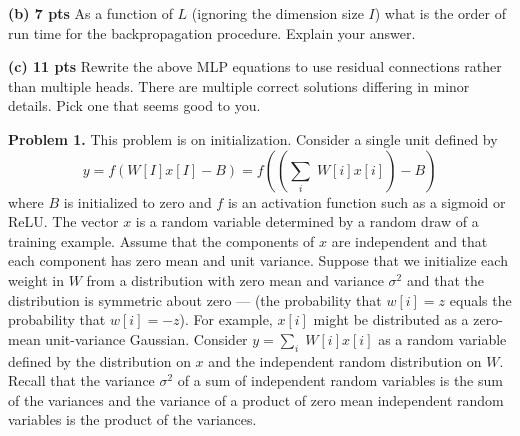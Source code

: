 \documentclass{article}
\newcommand{\solution}[1]{}
\begin{document}
\medskip
{\bf (b) 7 pts} As a function of $L$ (ignoring the dimension size $I$) what is the order of run time for the backpropagation procedure.
Explain your answer.

\solution{It is $O(L)$ --- linear in $L$.  Backpropagation loops over the assignments of the program and takes time proportional to the size of the program.
  Back-propagation over the final sum of losses produces a gradient for each prediction $\hat{y}_\ell$ which can be used as we back-propagate over the
  earlier assignments.
}

\medskip
{\bf (c) 11 pts} Rewrite the above MLP equations to use residual connections rather than multiple heads.  There are multiple correct solutions differing in minor details.  Pick one that seems
good to you.

\solution{
\begin{eqnarray*}
  h_0[i] & = & x[i] \\
  & \vdots & \\
  \tilde{h}_{\ell+1}[i] & = & \sigma(W^{h,h}_{\ell+1}[i,I]h_\ell[I] - B^{h,h}_{\ell+1}[i]) \\
  h_{\ell+1}[i] & = & \tilde{h}_{\ell+1}[i] + h_\ell[i] \\
  & \vdots & \\
  \hat{y} & = & W^{h,y}[I]h_L[I]- B^{h,y} \\
  \mathrm{Loss} & = & (y - \hat{y})^2
\end{eqnarray*}
}
\medsip
{\bf Problem 1.}  This problem is on initialization.  Consider a single unit defined by
$$y = f(W[I]x[I] - B) = f\left(\left(\sum_i\;W[i]x[i]\right) - B\right)$$
where $B$ is initialized to zero and $f$ is an activation function such as a sigmoid or ReLU.
The vector $x$ is a random variable determined by a random draw of a training example.
Assume that the components of $x$ are independent and that each component has zero mean and unit variance.
Suppose that we initialize each weight in $W$ from a distribution with
zero mean and variance $\sigma^2$ and that the distribution is symmetric about zero --- (the probability that $w[i] = z$ equals the probability that $w[i] = -z$).
For example, $x[i]$ might be distributed as a zero-mean unit-variance Gaussian.
Consider $y = \sum_i\;W[i]x[i]$ as a random variable defined by the distribution on $x$ and the independent random distribution on $W$.
Recall that the variance $\sigma^2$ of
a sum of independent random variables is the sum of the variances and the variance of a product of zero mean independent
random variables is the product of the variances.
\end{document}
